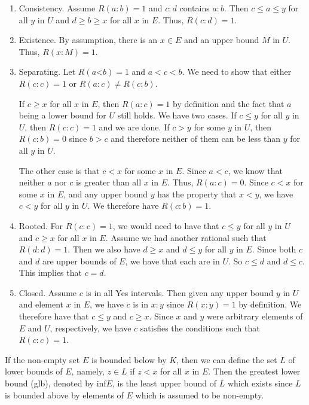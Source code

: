 \documentclass[12pt]{article}
\theoremstyle{remark}
\newcommand{\lt}{\mathord{<}}
\begin{document}
\begin{enumerate}
    \item Consistency. Assume $R(a:b)=1$ and $c:d$ contains $a:b$. Then $c \leq a \leq y$ for all $y$ in $U$ and $d \geq b \geq x$ for all $x$ in $E$. Thus, $R(c:d) = 1$.
    \item Existence. By assumption, there is an $x \in E$ and an upper bound $M$ in $U$. Thus, $R(x:M) = 1$. 
    \item Separating. Let $R(a\lt b)=1$ and $a < c< b$. We need to show that either $R(c:c)=1$ or $R(a:c) \neq R(c:b)$. 
    
    If $c \geq x$ for all $x$ in $E$, then $R(a:c)=1$ by definition and the fact that $a$ being a lower bound for $U$ still holds. We have two cases.  If $c \leq y$ for all $y$ in $U$, then $R(c:c)=1$ and we are done. If $c > y$ for some $y$ in $U$, then $R(c:b) = 0$ since $b > c$ and therefore neither of them can be less than $y$ for all $y$ in $U$. 
    
    The other case is that $c < x$ for some $x$ in $E$. Since $a < c$, we know that neither $a$ nor $c$ is greater than all $x$ in $E$. Thus, $R(a:c) = 0$. Since $c < x$ for some $x$ in $E$, and any upper bound $y$ has the property that $x < y$, we have $c < y$ for all $y$ in $U$. We therefore have $R(c:b)=1$.
    
    \item Rooted. For $R(c:c)=1$, we would need to have that $c \leq y$ for all $y$ in $U$ and $c \geq x$ for all $x$ in $E$. Assume we had another rational such that $R(d:d) = 1$. Then we also have $d \geq x$ and $d \leq y$ for all $y$ in $E$. Since both $c$ and $d$ are upper bounds of $E$, we have that each are in $U$. So $c \leq d$ and $d \leq c$. This implies that $c = d$. 
    \item Closed. Assume $c$ is in all Yes intervals. Then given any upper bound $y$ in $U$ and element $x$ in $E$, we have $c$ is in $x:y$ since $R(x:y)=1$ by definition. We therefore have that $c \leq y$ and $c \geq x$. Since $x$ and $y$ were arbitrary elements of $E$ and $U$, respectively, we have $c$ satisfies the conditions such that $R(c:c)=1$.
\end{enumerate}

If the non-empty set $E$ is bounded below by $K$, then we can define the set $L$ of lower bounds of $E$, namely, $z \in L$ if $z < x$ for all $x$ in $E$. Then the greatest lower bound (glb), denoted by $\mathrm{inf} E$, is the least upper bound of $L$ which exists since $L$ is bounded above by elements of $E$ which is assumed to be non-empty. 
\end{document}
